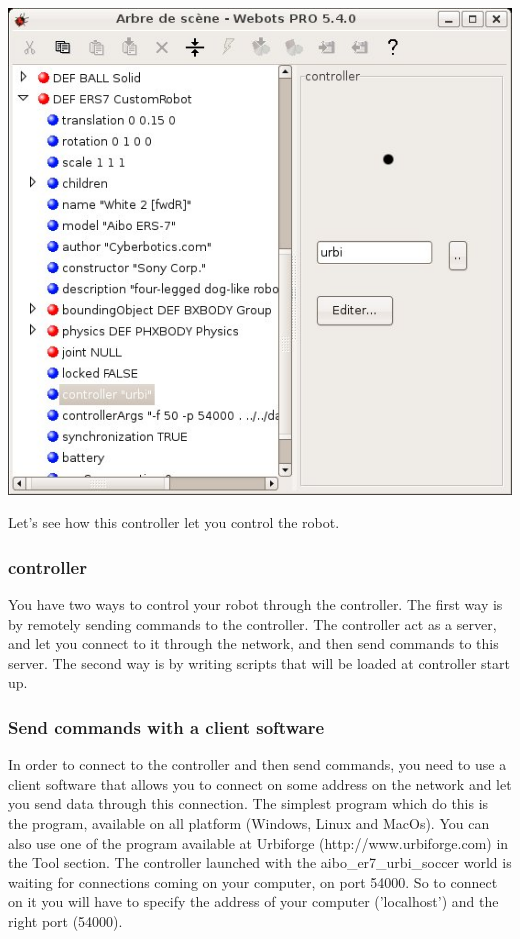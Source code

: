 \begin{center}
  \includegraphics[width=.8\linewidth]{img/webots/scene-tree}
\end{center}

Let's see how this controller let you control the robot.


\subsubsection{\urbi controller}

You have two ways to control your robot through the \urbi
controller. The first way is by remotely sending commands to the \urbi
controller. The \urbi controller act as a server, and let you connect
to it through the network, and then send \urbi commands to this server.
The second way is by writing \urbi scripts that will be loaded at
controller start up.


\subsubsection{Send commands with a client software}

In order to connect to the \urbi controller and then send commands, you
need to use a client software that allows you to connect on some
address on the network and let you send data through this connection.
The simplest program which do this is the  program,
available on all platform (Windows, Linux and MacOs). You can also use
one of the program available at Urbiforge (http://www.urbiforge.com)
in the Tool section.  The \urbi controller launched with the
aibo\_er7\_urbi\_soccer world is waiting for connections coming on
your computer, on port 54000. So to connect on it you will have to
specify the address of your computer ('localhost') and the right port
(54000).


